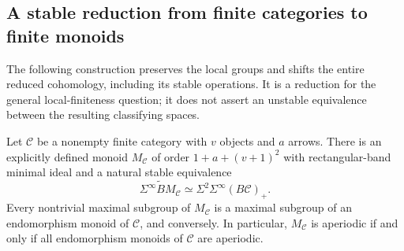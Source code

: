 \subsection{A stable reduction from finite categories to finite monoids}

The following construction preserves the local groups and shifts the
entire reduced cohomology, including its stable operations.  It is a
reduction for the general local-finiteness question; it does not assert
an unstable equivalence between the resulting classifying spaces.

\begin{proposition}\label{E:category-consolidation}
Let $\mathcal C$ be a nonempty finite category with $v$ objects and $a$
arrows.  There is an explicitly defined monoid $M_{\mathcal C}$ of order
$1+a+(v+1)^2$ with rectangular-band minimal ideal and a natural stable
equivalence
\[
 \widetilde{\Sigma^\infty BM_{\mathcal C}}
       \simeq \Sigma^2\Sigma^\infty(B\mathcal C)_+ .
\]
Every nontrivial maximal subgroup of $M_{\mathcal C}$ is a maximal
subgroup of an endomorphism monoid of $\mathcal C$, and conversely.
In particular, $M_{\mathcal C}$ is aperiodic if and only if all
endomorphism monoids of $\mathcal C$ are aperiodic.
\end{proposition}


